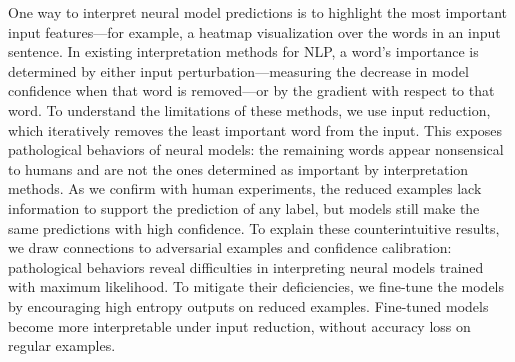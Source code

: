 One way to interpret neural model predictions is to highlight the most important input features---for example, a heatmap visualization over the words in an input sentence.  In existing interpretation methods for NLP, a word's importance is determined by either input perturbation---measuring the decrease in model confidence when that word is removed---or by the gradient with respect to that word.  To understand the limitations of these methods, we use input reduction, which iteratively removes the least important word from the input. This exposes pathological behaviors of neural models: the remaining words appear nonsensical to humans and are not the ones determined as important by interpretation methods. As we confirm with human experiments, the reduced examples lack information to support the prediction of any label, but models still make the same predictions with high confidence.  To explain these counterintuitive results, we draw connections to adversarial examples and confidence calibration: pathological behaviors reveal difficulties in interpreting neural models trained with maximum likelihood.  To mitigate their deficiencies, we fine-tune the models by encouraging high entropy outputs on reduced examples.  Fine-tuned models become more interpretable under input reduction, without accuracy loss on regular examples.
